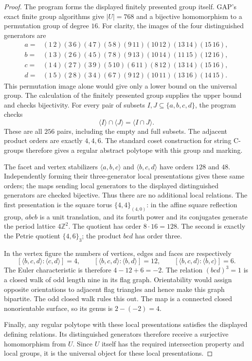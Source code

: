 \documentclass[11pt,a4paper]{article}
\begin{document}
\begin{proof}
The program  forms the displayed finitely presented group
itself. GAP's exact finite group algorithms give $|U|=768$ and a bijective
homomorphism to a permutation group of degree $16$. For clarity, the
images of the four distinguished generators are
\begin{align*}
a={}&(1\,2)(3\,6)(4\,7)(5\,8)(9\,11)(10\,12)(13\,14)(15\,16),\\
b={}&(1\,3)(2\,6)(4\,5)(7\,8)(9\,13)(10\,14)(11\,15)(12\,16),\\
c={}&(1\,4)(2\,7)(3\,9)(5\,10)(6\,11)(8\,12)(13\,14)(15\,16),\\
d={}&(1\,5)(2\,8)(3\,4)(6\,7)(9\,12)(10\,11)(13\,16)(14\,15).
\end{align*}
This permutation image alone would give only a lower bound on the
universal group. The calculation of the finitely presented group supplies
the upper bound and checks bijectivity. For every pair of subsets
$I,J\subseteq\{a,b,c,d\}$, the program checks
\[
 \langle I\rangle\cap\langle J\rangle=\langle I\cap J\rangle.
\]
These are all $256$ pairs, including the empty and full subsets. The
adjacent product orders are exactly $4,4,6$. The standard coset
construction for string C-groups therefore gives a regular abstract
polytope with this group and marking.

The facet and vertex stabilizers $\langle a,b,c\rangle$ and
$\langle b,c,d\rangle$ have orders $128$ and $48$. Independently forming
their three-generator local presentations gives these same orders; the
maps sending local generators to the displayed distinguished generators
are checked bijective. Thus there are no additional local relations.
The first presentation is the square torus $\{4,4\}_{(4,0)}$: in the
affine square reflection group, $abcb$ is a unit translation, and its
fourth power and its conjugates generate the period lattice $4\mathbb Z^2$.
The quotient has order $8\cdot16=128$. The second is exactly the
Petrie quotient $\{4,6\}_3$; the product $bcd$ has order three.

In the vertex figure the numbers of vertices, edges and faces are
respectively
\[
 [\langle b,c,d\rangle:\langle c,d\rangle]=4,\qquad
 [\langle b,c,d\rangle:\langle b,d\rangle]=12,\qquad
 [\langle b,c,d\rangle:\langle b,c\rangle]=6.
\]
The Euler characteristic is therefore $4-12+6=-2$. The relation
$(bcd)^3=1$ is a closed walk of odd length nine in its flag graph.
Orientability would assign opposite orientations to adjacent flag
triangles and hence make this graph bipartite. The odd closed walk rules
this out. The map is a connected closed nonorientable surface, so its
genus is $2-(-2)=4$.

Finally, any regular polytope with these local presentations satisfies
the displayed defining relations. Its distinguished generators therefore
receive a surjective homomorphism from $U$. Since $U$ itself has the
required intersection property and local groups, it is the universal
object for these local presentations.
\end{proof}
\end{document}
